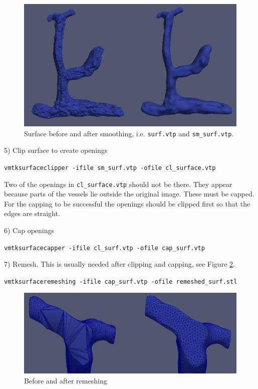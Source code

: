 \documentclass[epsfig,11pt]{article}
\begin{document}
\begin{figure}[h!] 
\begin{center}
  \includegraphics[scale=0.3]{smoothing.png}
  \end{center}
  \caption{Surface before and after smoothing, i.e. \texttt{surf.vtp} and \texttt{sm\_surf.vtp}.}
  \label{fig:smoothing}
\end{figure}

5) Clip surface to create openings
\begin{framed}       
    \texttt{vmtksurfaceclipper -ifile sm\_surf.vtp -ofile cl\_surface.vtp}
\end{framed}

Two of the openings in \texttt{cl\_surface.vtp} should not be there. They appear because parts of the vessels lie outside the original image. These must be capped. For the capping to be successful the openings should be clipped first so that the edges are straight.

6) Cap openings 
\begin{framed}    
\texttt{vmtksurfacecapper -ifile cl\_surf.vtp -ofile cap\_surf.vtp}
\end{framed}
7) Remesh. This is usually needed after clipping and capping, see Figure \ref{fig:remesh}. 
\begin{framed}    
\texttt{vmtksurfaceremeshing -ifile cap\_surf.vtp -ofile remeshed\_surf.stl}
\end{framed}

\begin{figure}[h!] 
\begin{center}
  \includegraphics[scale=0.3]{remsh.png}
  \end{center}
  \caption{Before and after remeshing}
    \label{fig:remesh}
\end{figure}
\end{document}

